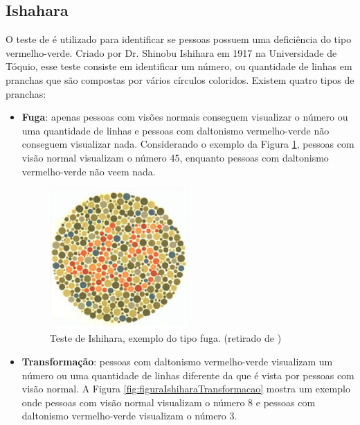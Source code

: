 \documentclass[	12pt, Times, openright, twoside, a4paper, english, brazil]{abntex2}
\begin{document}
\subsection{Ishahara}
\label{subsection:Ishihara}
 O teste de  é utilizado para identificar se pessoas possuem uma deficiência do tipo vermelho-verde. Criado por Dr. Shinobu Ishihara em 1917 na Universidade de Tóquio, esse teste consiste em identificar um número, ou quantidade de linhas em pranchas que são compostas por vários círculos coloridos.
Existem quatro tipos de pranchas:
\begin{itemize}
\item \textbf{Fuga}: apenas pessoas com visões normais conseguem visualizar o número ou uma quantidade de linhas e pessoas com daltonismo vermelho-verde não conseguem visualizar nada. Considerando o exemplo da Figura  \ref{fig:figuraIshiharaFuga}, pessoas com visão normal visualizam o número 45, enquanto pessoas com daltonismo vermelho-verde não veem nada.

\begin{figure}[!htb]
\centering \includegraphics[width=0.5\textwidth]{figuraIshiharaFuga.png}
\caption{Teste de Ishihara, exemplo do tipo fuga. (retirado de ) \label{fig:figuraIshiharaFuga}}
\end{figure}
 
\item \textbf{Transformação}: pessoas com daltonismo vermelho-verde visualizam um número ou uma quantidade de linhas diferente da que é vista por pessoas com visão normal. A Figura \ref{fig:figuraIshiharaTransformacao} mostra um exemplo onde pessoas com visão normal visualizam o número 8 e pessoas com daltonismo vermelho-verde visualizam o número 3.
 

\end{itemize}
\end{document}
